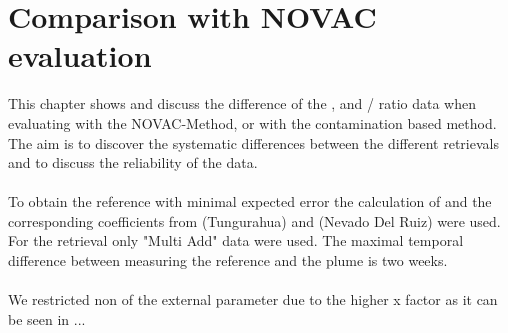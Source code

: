 \documentclass  [
  paper    = a4,
  BCOR     = 10mm,
  twoside,
  fontsize = 12pt,
  fleqn,
  toc      = bibnumbered,
  toc      = listofnumbered,
  numbers  = noendperiod,
  headings = normal,
  listof   = leveldown,
  version  = 3.03
]                                       {scrreprt}
\begin{document}
	\chapter{Comparison with NOVAC evaluation}
	This chapter shows and discuss the difference of the ,   and /  ratio data when evaluating with the NOVAC-Method, or with the contamination based method.
	The aim is to discover the systematic differences between the different retrievals and to discuss the reliability of the data.\\
	\\
	To obtain the reference with minimal expected    error the calculation of  and the corresponding coefficients from  (Tungurahua) and  (Nevado Del Ruiz) were used. 
	For the retrieval only "Multi Add" data were used. The maximal temporal difference between measuring the reference and the plume is two weeks.\\
	\\
	We restricted non of the external parameter due to the higher x factor as it can be seen in ...\\
	
\end{document}
